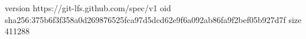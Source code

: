 version https://git-lfs.github.com/spec/v1
oid sha256:375b6f3f358a0d269876525fca97d5dcd62e9f6a092ab86fa9f2bef05b927d7f
size 411288
